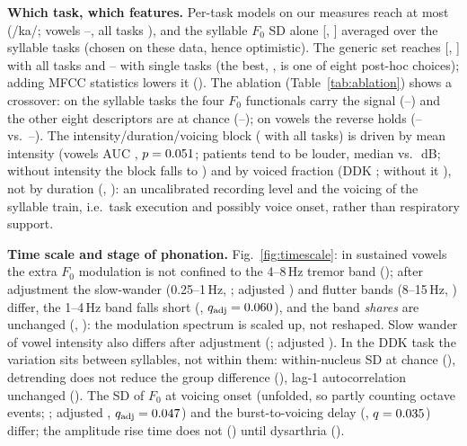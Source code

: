 \documentclass{article}
\begin{document}
\textbf{Which task, which features.} Per-task models on our measures reach at most \tkaAUC{} (/ka/; vowels \toAUC--\tiAUC, all tasks \tallAUC), and the syllable $F_0$ SD alone \tddkoneAUC{} [\tddkoneLo, \tddkoneHi] averaged over the syllable tasks (chosen on these data, hence optimistic). The generic set reaches \abAllAll{} [\abAllAllLo, \abAllAllHi] with all tasks and \gSingleMin--\gSingleMax{} with single tasks (the best, \gBestTask, is one of eight post-hoc choices); adding MFCC statistics lowers it (\gAllMAUC). The ablation (Table~\ref{tab:ablation}) shows a crossover: on the syllable tasks the four $F_0$ functionals carry the signal (\abFzDdkMin--\abFzDdkMax) and the other eight descriptors are at chance (\abNfDdkMin--\abNfDdkMax); on vowels the reverse holds (\abNfVowMin--\abNfVowMax{} vs.\ \abFzVowMin--\abFzVowMax). The intensity/duration/voicing block (\abIdvAll{} with all tasks) is driven by mean intensity (vowels AUC \idvIntVAUC, $p=0.051$; patients tend to be louder, median \idvIntVMedND{} vs.\ \idvIntVMedHC\,dB; without intensity the block falls to \idvNoInt) and by voiced fraction (DDK \idvVoicedDAUC; without it \idvNoVoiced), not by duration (\idvDurVAUC, \idvDurDAUC): an uncalibrated recording level and the voicing of the syllable train, i.e.\ task execution and possibly voice onset, rather than respiratory support.

\begin{table}[t]
\centering\scriptsize
\caption{Ablation of the generic set, HC vs.\ ALS-ND: cross-validated AUC of one descriptor block from single syllable tasks or vowels (range over tasks) or from all tasks (vowel and DDK means), and the age/sex floor. $^\ddagger$Median and 2.5--97.5\% range of the permutation null.}
\label{tab:ablation}
\setlength{\tabcolsep}{2pt}

\end{table}

\textbf{Time scale and stage of phonation.} Fig.~\ref{fig:timescale}: in sustained vowels the extra $F_0$ modulation is not confined to the 4--8\,Hz tremor band (\eTremorAUC); after adjustment the slow-wander (0.25--1\,Hz, \eWanderAUC; adjusted \eWanderAdj) and flutter bands (8--15\,Hz, \eFlutterAUC) differ, the 1--4\,Hz band falls short (\eSlowAUC, $q_{\rm adj}=0.060$), and the band \emph{shares} are unchanged (\eWanderRelAUC, \eTremorRelAUC): the modulation spectrum is scaled up, not reshaped. Slow wander of vowel intensity also differs after adjustment (\eIntWanderAUC; adjusted \eIntWanderAdj). In the DDK task the variation sits between syllables, not within them: within-nucleus SD at chance (\eMicroAUC), detrending does not reduce the group difference (\eMacroDetrAUC), lag-1 autocorrelation unchanged (\eLagAUC). The SD of $F_0$ at voicing onset (unfolded, so partly counting octave events; \eOnsetAUC; adjusted \eOnsetAdj, $q_{\rm adj}=0.047$) and the burst-to-voicing delay (\eVotAUC, $q=0.035$) differ; the amplitude rise time does not (\eRiseAUC) until dysarthria (\eRiseDAUC).
\end{document}
